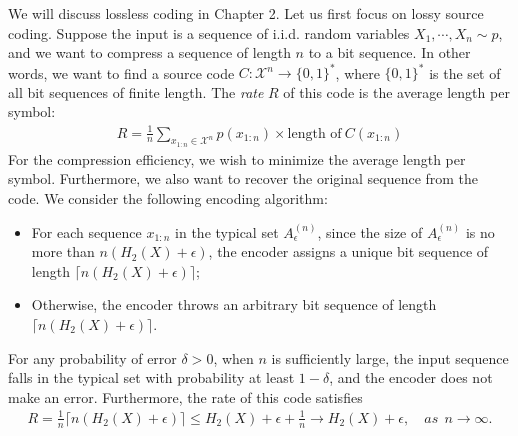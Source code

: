 \documentclass{article}
\numberwithin{equation}{section}
\renewcommand{\cal}{\mathcal}
\theoremstyle{plain}
\theoremstyle{definition}
\begin{document}
We will discuss lossless coding in Chapter 2. Let us first focus on lossy source coding. Suppose the input is a sequence of i.i.d. random variables $X_1,\cdots,X_n\sim p$, and we want to compress a sequence of length $n$ to a bit sequence. In other words, we want to find a source code $C:\cal{X}^n\to\{0,1\}^*$, where $\{0,1\}^*$ is the set of all bit sequences of finite length. The \textit{rate} $R$ of this code is the average length per symbol:
\begin{align*}
	R=\frac{1}{n}\sum_{x_{1:n}\in\cal{X}^n}p(x_{1:n})\times\text{length of}\ C(x_{1:n})
\end{align*}
For the compression efficiency, we wish to minimize the average length per symbol. Furthermore, we also want to recover the original sequence from the code. We consider the following encoding algorithm:
\begin{itemize}
\item For each sequence $x_{1:n}$ in the typical set $A_\epsilon^{(n)}$, since the size of $A_\epsilon^{(n)}$ is no more than $n(H_2(X)+\epsilon)$, the encoder assigns a unique bit sequence of length $\lceil n(H_2(X)+\epsilon)\rceil$; 
\item Otherwise, the encoder throws an arbitrary bit sequence of length $\lceil n(H_2(X)+\epsilon)\rceil$.
\end{itemize} 
For any probability of error $\delta>0$, when $n$ is sufficiently large, the input sequence falls in the typical set with probability at least $1-\delta$, and the encoder does not make an error. Furthermore, the rate of this code satisfies
\begin{align*}
	R=\frac{1}{n}\lceil n(H_2(X)+\epsilon)\rceil\leq H_2(X)+\epsilon+\frac{1}{n}\to H_2(X)+\epsilon,\quad as\ \ n\to\infty.
\end{align*}
\end{document}
